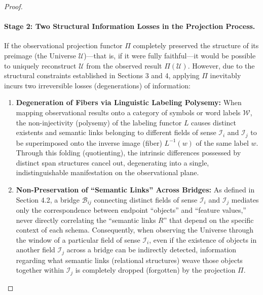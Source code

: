 \documentclass[11pt,a4paper]{article}
\theoremstyle{definition}
\theoremstyle{plain}
\begin{document}
\begin{proof}
\paragraph{Stage 2: Two Structural Information Losses in the Projection Process.}
If the observational projection functor $\Pi$ completely preserved the structure of its preimage (the Universe $\mathcal{U}$)---that is, if it were fully faithful---it would be possible to uniquely reconstruct $\mathcal{U}$ from the observed result $\Pi(\mathcal{U})$. However, due to the structural constraints established in Sections 3 and 4, applying $\Pi$ inevitably incurs two irreversible losses (degenerations) of information:
\begin{enumerate}
    \item \textbf{Degeneration of Fibers via Linguistic Labeling Polysemy:} When mapping observational results onto a category of symbols or word labels $\mathcal{W}$, the non-injectivity (polysemy) of the labeling functor $L$ causes distinct existents and semantic links belonging to different fields of sense $\mathcal{I}_{i}$ and $\mathcal{I}_{j}$ to be superimposed onto the inverse image (fiber) $L^{-1}(w)$ of the same label $w$. Through this folding (quotienting), the intrinsic differences possessed by distinct span structures cancel out, degenerating into a single, indistinguishable manifestation on the observational plane.
    \item \textbf{Non-Preservation of ``Semantic Links'' Across Bridges:} As defined in Section 4.2, a bridge $\mathcal{B}_{ij}$ connecting distinct fields of sense $\mathcal{I}_{i}$ and $\mathcal{I}_{j}$ mediates only the correspondence between endpoint ``objects'' and ``feature values,'' never directly correlating the ``semantic links $R$'' that depend on the specific context of each schema. Consequently, when observing the Universe through the window of a particular field of sense $\mathcal{I}_{i}$, even if the existence of objects in another field $\mathcal{I}_{j}$ across a bridge can be indirectly detected, information regarding what semantic links (relational structures) weave those objects together within $\mathcal{I}_{j}$ is completely dropped (forgotten) by the projection $\Pi$.
\end{enumerate}


\end{proof}
\end{document}

